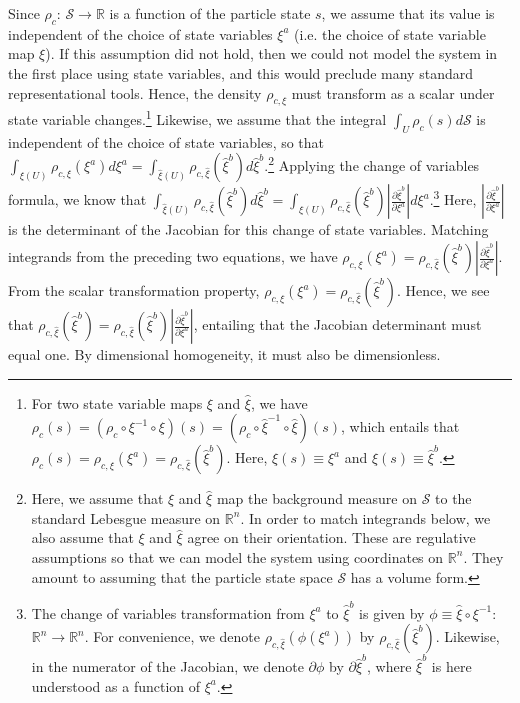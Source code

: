 \documentclass[12pt, english, twoside]{article} %
\begin{document}
Since $\rho_c$: $\mathcal{S} \to \mathbb{R}$ is a function of the particle state $s$, we assume that its value is independent of the choice of state variables $\xi^a$ (i.e. the choice of state variable map $\xi$). If this assumption did not hold, then we could not model the system in the first place using state variables, and this would preclude many standard representational tools. Hence, the density $\rho_{c, \xi}$ must transform as a scalar under state variable changes.\footnote{For two state variable maps $\xi$ and $\hat{\xi}$, we have $\rho_c(s) = (\rho_c \circ \xi^{-1} \circ \xi)(s) = (\rho_c \circ \hat{\xi}^{-1} \circ \hat{\xi})(s)$, which entails that $\rho_c(s) = \rho_{c, \xi} (\xi^a) = \rho_{c, \hat{\xi}} (\hat{\xi}^b)$. Here, $\xi(s) \equiv \xi^a$ and $\hat{\xi}(s) \equiv \hat{\xi}^b$.} Likewise, we assume that the integral $\int_U \rho_c(s) d\mathcal{S} $ is independent of the choice of state variables, so that $\int_{\xi(U)} \rho_{c, \xi} (\xi^a) d \xi^a = \int_{\hat{\xi}(U)} \rho_{c, \hat{\xi}} (\hat{\xi}^b) d \hat{\xi}^b$.\footnote{Here, we assume that $\xi$ and $\hat{\xi}$ map the background measure on $\mathcal{S}$ to the standard Lebesgue measure on $\mathbb{R}^n$. In order to match integrands below, we also assume that $\xi$ and $\hat{\xi}$ agree on their orientation. These are regulative assumptions so that we can model the system using coordinates on $\mathbb{R}^n$. They amount to assuming that the particle state space $\mathcal{S}$ has a volume form.} Applying the change of variables formula, we know that $\int_{\hat{\xi}(U)} \rho_{c, \hat{\xi}} (\hat{\xi}^b) d \hat{\xi}^b= \int_{\xi(U)} \rho_{c, \hat{\xi}} (\hat{\xi}^b) \left|\frac{\partial \hat{\xi}^b}{\partial \xi^a} \right|  d \xi^a$.\footnote{The change of variables transformation from $\xi^a$ to $\hat{\xi}^b$ is given by $\phi \equiv \hat{\xi} \circ \xi^{-1}$: $\mathbb{R}^n \to \mathbb{R}^n $. For convenience, we denote $\rho_{c, \hat{\xi}} (\phi(\xi^a))$ by $\rho_{c, \hat{\xi}} (\hat{\xi}^b)$. Likewise, in the numerator of the Jacobian, we denote $\partial \phi$ by $\partial \hat{\xi}^b$, where $\hat{\xi}^b$ is here understood as a function of $\xi^a$.} Here, $ \left|\frac{\partial \hat{\xi}^b}{\partial \xi^a} \right|$ is the determinant of the Jacobian for this change of state variables. Matching integrands from the preceding two equations, we have $\rho_{c, \xi} (\xi^a) = \rho_{c, \hat{\xi}} (\hat{\xi}^b) \left|\frac{\partial \hat{\xi}^b}{\partial \xi^a} \right|$. From the scalar transformation property, $\rho_{c, \xi} (\xi^a) = \rho_{c, \hat{\xi}} (\hat{\xi}^b)$. Hence, we see that $\rho_{c, \hat{\xi}} (\hat{\xi}^b) =  \rho_{c, \hat{\xi}} (\hat{\xi}^b) \left|\frac{\partial \hat{\xi}^b}{\partial \xi^a} \right|$, entailing that the Jacobian determinant must equal one. By dimensional homogeneity, it must also be dimensionless. 
\end{document}
